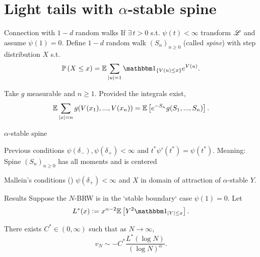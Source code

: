 \documentclass{beamer}
\begin{document}
\section{Light tails with $\alpha$-stable spine}
\begin{frame}{Connection with $1-d$ random walks}
If $\exists\,t>0$ s.t. $\psi(t) < \infty$ transform $\mathscr{L}$ and assume $\psi(1) = 0$. Define $1-d$ random walk $(S_n)_{n \geq 0}$ (called \textit{spine}) with step distribution $X$ s.t. 
\begin{equation}
\Pr{X \leq x} = \E \sum\limits_{|u|=1} \Ind_{\{V(u) \leq x \}} e^{V(u)}. 
\end{equation}

\begin{lemma}
Take $g$ measurable and $n \geq 1$. Provided the integrals exist, 
\begin{equation}
\mathbb{E} \sum\limits_{|x| = n} g(V(x_1), ...,V(x_n)) = \mathbb{E}\left[ e^{-S_n} g(S_1, ...,S_n) \right]. 
\end{equation}
\end{lemma}
\end{frame}








\begin{frame}{$\alpha$-stable spine}
\begin{block}{Previous conditions}
$\psi(\delta_-), \psi(\delta_+) < \infty$ and $t^* \psi'(t^*) = \psi(t^*)$. Meaning: Spine $(S_n)_{n \geq 0}$ has all moments and is centered
\end{block}

\begin{block}{Mallein's conditions (\cite{mallein2018n})}
$\psi(\delta_+) < \infty$ and $X$ in domain of attraction of $\alpha$-stable $Y$. 
\end{block}

\end{frame}









\begin{frame}{Results}
Suppose the $N$-BRW is in the `stable boundary` case $\psi(1) = 0$. Let
\begin{equation}\nonumber
L^*(x) \defeq x^{\alpha - 2} \Ex{Y^2 \Ind_{|Y| \leq x}}. 
\end{equation}

\begin{theorem}
There exists $C^* \in (0, \infty)$ such that as $N \to \infty$, 
\begin{equation}\nonumber
v_N \sim -C^* \frac{L^*(\log N)}{(\log N)^{\alpha}}. 
\end{equation}
\end{theorem}
\end{frame}
\end{document}
